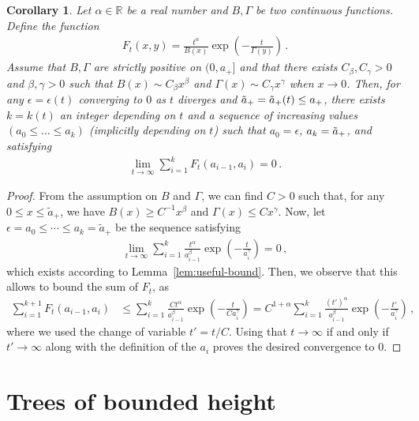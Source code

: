 \documentclass{article}
\newcommand{\1}{\mathbbm{1}}								%
\newtheorem{corollary}[theorem]{Corollary}
\theoremstyle{definition}
\numberwithin{equation}{section}
\newcommand{\R}{\mathbb R}
\begin{document}
\begin{corollary}\label{cor:useful-bound}
    Let $\alpha\in\R$ be a real number and $B,\Gamma$ be two continuous functions.
    Define the function
    \begin{align*}
        F_t(x,y)=\frac{t^\alpha}{B(x)}\exp\left(-\frac{t}{\Gamma(y)}\right)\,.
    \end{align*}
    Assume that $B,\Gamma$ are strictly positive on $(0,a_+]$ and that there exists $C_\beta,C_\gamma>0$ and $\beta,\gamma>0$ such that $B(x)\sim C_\beta x^\beta$ and $\Gamma(x)\sim C_\gamma x^\gamma$ when $x\rightarrow0$.
    Then, for any $\epsilon=\epsilon(t)$ converging to $0$ as $t$ diverges and $\Tilde{a}_+=\Tilde{a}_+(t)\leq a_+$, there exists $k=k(t)$ an integer depending on $t$ and a sequence of increasing values $(a_0\leq\ldots\leq a_k)$ (implicitly depending on $t$) such that $a_0=\epsilon$, $a_k=\Tilde{a}_+$, and satisfying
    \begin{align*}
        \lim_{t\rightarrow\infty}\sum_{i=1}^kF_t(a_{i-1},a_i)=0\,.
    \end{align*}
\end{corollary}

\begin{proof}
    From the assumption on $B$ and $\Gamma$, we can find $C>0$ such that, for any $0\leq x\leq\tilde{a}_+$, we have $B(x)\geq C^{-1}x^\beta$ and $\Gamma(x)\leq Cx^\gamma$.
    Now, let $\epsilon=a_0\leq\cdots\leq a_k=\tilde{a}_+$ be the sequence satisfying
    \begin{align*}
        \lim_{t\rightarrow\infty}\sum_{i=1}^k\frac{t^\alpha}{a_{i-1}^\beta}\exp\left(-\frac{t}{a_i^\gamma}\right)=0\,,
    \end{align*}
    which exists according to Lemma~\ref{lem:useful-bound}.
    Then, we observe that this allows to bound the sum of $F_t$, as
    \begin{align*}
        \sum_{i=1}^{k+1}F_t(a_{i-1},a_i)
        &\leq\sum_{i=1}^k\frac{Ct^\alpha}{a_{i-1}^\beta}\exp\left(-\frac{t}{Ca_i^\gamma}\right)=C^{1+\alpha}\sum_{i=1}^k\frac{(t')^\alpha}{a_{i-1}^\beta}\exp\left(-\frac{t'}{a_i^\gamma}\right)\,,
    \end{align*}
    where we used the change of variable $t'=t/C$.
    Using that $t\rightarrow\infty$ if and only if $t'\rightarrow\infty$ along with the definition of the $a_i$ proves the desired convergence to $0$.
\end{proof}

\section{Trees of bounded height}\label{sec:ht-bdd tree}
\end{document}
